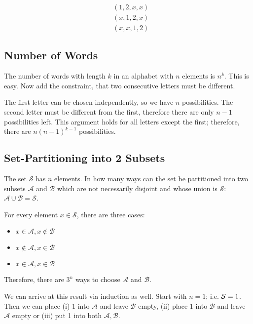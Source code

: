 \begin{align*}
&(1,2,x,x)\\
&(x,1,2,x)\\
&(x,x,1,2)
\end{align*}


\subsection{Number of Words}

The number of words with length \(k\) in an alphabet with \(n\) elements
is \(n^k\). This is easy. Now add the constraint, that two consecutive
letters must be different.

The first letter can be chosen independently, so we have \(n\)
possibilities. The second letter must be different from the first,
therefore there are only \(n-1\) possibilities left. This argument holds
for all letters except the first; therefore, there are \(n(n-1)^{k-1}\)
possibilities.

\subsection{Set-Partitioning into 2 Subsets}

The set \(\mathcal{S}\) has \(n\) elements. In how many ways can the set
be partitioned into two subsets \(\mathcal{A}\) and \(\mathcal{B}\)
which are not necessarily disjoint and whose union is \(\mathcal{S}\):
\(\mathcal{A} \cup \mathcal{B} = \mathcal{S}\).

For every element \(x \in \mathcal{S}\), there are three cases:

\begin{itemize}
\item
  \(x \in \mathcal{A}, x \notin \mathcal{B}\)
\item
  \(x \notin \mathcal{A}, x \in \mathcal{B}\)
\item
  \(x \in \mathcal{A}, x \in \mathcal{B}\)
\end{itemize}

Therefore, there are \(3^n\) ways to choose \(\mathcal{A}\) and
\(\mathcal{B}\).

We can arrive at this result via induction as well. Start with \(n=1\);
i.e. \(\mathcal{S} = \\{1\\}\). Then we can place (i) 1 into
\(\mathcal{A}\) and leave \(\mathcal{B}\) empty, (ii) place 1 into
\(\mathcal{B}\) and leave \(\mathcal{A}\) empty or (iii) put 1 into both
\(\mathcal{A}, \mathcal{B}\).

